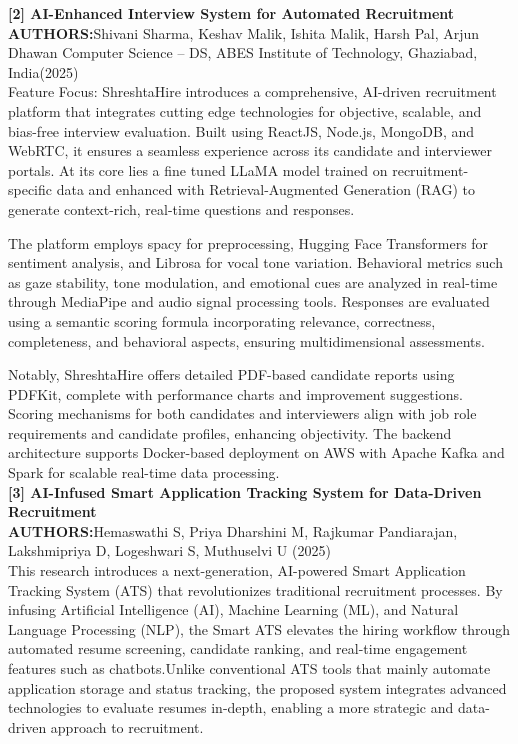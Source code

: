 \documentclass[a4paper, 12pt]{report}
\begin{document}
\noindent\textbf{[2] AI-Enhanced Interview System for Automated Recruitment}\\
\textbf{AUTHORS:}Shivani Sharma, Keshav Malik, Ishita Malik, Harsh Pal, Arjun Dhawan Computer Science – DS, ABES Institute of Technology, Ghaziabad, India(2025) \\
Feature Focus: ShreshtaHire introduces a comprehensive, AI-driven recruitment platform that integrates cutting edge technologies for objective, scalable, and bias-free interview evaluation. Built using ReactJS, Node.js, MongoDB, and WebRTC, it ensures a seamless experience across its candidate and interviewer portals. At its core lies a fine tuned LLaMA model trained on recruitment-specific data and enhanced with Retrieval-Augmented Generation (RAG) to generate context-rich, real-time questions and responses.

The platform employs spacy for preprocessing, Hugging Face Transformers for sentiment analysis, and Librosa for vocal tone variation. Behavioral metrics such as gaze stability, tone modulation, and emotional cues are analyzed in real-time through MediaPipe and audio signal processing tools. Responses are evaluated using a semantic scoring formula incorporating relevance, correctness, completeness, and behavioral aspects, ensuring multidimensional assessments.

Notably, ShreshtaHire offers detailed PDF-based candidate reports using PDFKit, complete with performance charts and improvement suggestions. Scoring mechanisms for both candidates and interviewers align with job role requirements and candidate profiles, enhancing objectivity. The backend architecture supports Docker-based deployment on AWS with Apache Kafka and Spark for scalable real-time data processing.
\\
\noindent\textbf{[3] AI-Infused Smart Application Tracking System for Data-Driven Recruitment}\\
\textbf{AUTHORS:}Hemaswathi S, Priya Dharshini M, Rajkumar Pandiarajan, Lakshmipriya D, Logeshwari S, Muthuselvi U (2025)\\
This research introduces a next-generation, AI-powered Smart Application Tracking System (ATS) that revolutionizes traditional recruitment processes. By infusing Artificial Intelligence (AI), Machine Learning (ML), and Natural Language Processing (NLP), the Smart ATS elevates the hiring workflow through automated resume screening, candidate ranking, and real-time engagement features such as chatbots.Unlike conventional ATS tools that mainly automate application storage and status tracking, the proposed system integrates advanced technologies to evaluate resumes in-depth, enabling a more strategic and data-driven approach to recruitment.
\end{document}
